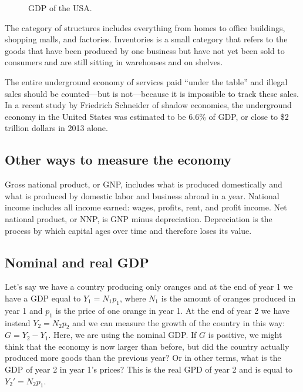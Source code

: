 \begin{figure}
    \caption{GDP of the USA.}
    \label{fig:usa_gdp_pie}
\end{figure}


The category of structures includes everything from homes to office buildings, shopping malls, and factories.
Inventories is a small category that refers to the goods that have been produced by one business but have not yet been sold to consumers and are still sitting in warehouses and on shelves.

The entire underground economy of services paid “under the table” and illegal sales should be counted—but is not—because it is impossible to track these sales. In a recent study by Friedrich Schneider of shadow economies, the underground economy in the United States was estimated to be 6.6\% of GDP, or close to \$2 trillion dollars in 2013 alone.

\subsection{Other ways to measure the economy}
Gross national product, or GNP, includes what is produced domestically and what is produced by domestic labor and business abroad in a year.
National income includes all income earned: wages, profits, rent, and profit income.
Net national product, or NNP, is GNP minus depreciation.
Depreciation is the process by which capital ages over time and therefore loses its value.

\subsection{Nominal and real GDP}
Let's say we have a country producing only oranges and at the end of year 1 we have a GDP equal to $Y_1 = N_1 p_1$, where $N_1$ is the amount of oranges produced in year 1 and $p_1$ is the price of one orange in year 1. At the end of year 2 we have instead $Y_2 = N_2 p_2$ and we can measure the growth of the country in this way: $G = Y_2 - Y_1$. Here, we are using the nominal GDP. If $G$ is positive, we might think that the economy is now larger than before, but did the country actually produced more goods than the previous year? Or in other terms, what is the GDP of year 2 in year 1's prices? This is the real GPD of year 2 and is equal to $Y_2' = N_2 p_1$.

